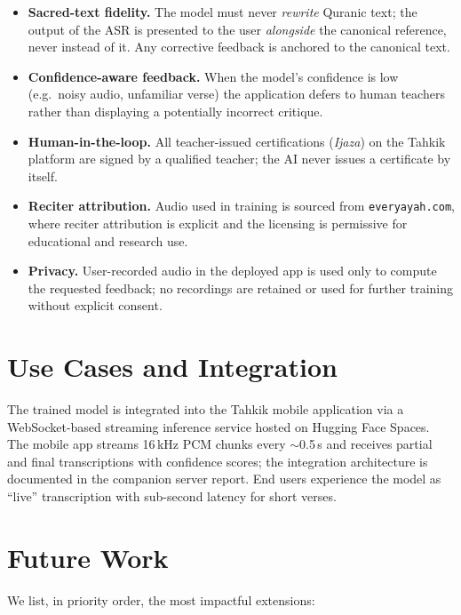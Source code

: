 \documentclass[12pt,a4paper]{report}
\begin{document}
\begin{itemize}
  \item \textbf{Sacred-text fidelity.} The model must never \emph{rewrite}
        Quranic text; the output of the ASR is presented to the user
        \emph{alongside} the canonical reference, never instead of it.
        Any corrective feedback is anchored to the canonical text.
  \item \textbf{Confidence-aware feedback.} When the model's confidence
        is low (e.g.\ noisy audio, unfamiliar verse) the application
        defers to human teachers rather than displaying a potentially
        incorrect critique.
  \item \textbf{Human-in-the-loop.} All teacher-issued certifications
        (\textit{Ijaza}) on the Tahkik platform are signed by a
        qualified teacher; the AI never issues a certificate by itself.
  \item \textbf{Reciter attribution.} Audio used in training is sourced
        from \texttt{everyayah.com}, where reciter attribution is
        explicit and the licensing is permissive for educational and
        research use.
  \item \textbf{Privacy.} User-recorded audio in the deployed app is
        used only to compute the requested feedback; no recordings are
        retained or used for further training without explicit consent.
\end{itemize}

\section{Use Cases and Integration}

The trained model is integrated into the Tahkik mobile application via a
WebSocket-based streaming inference service hosted on Hugging Face
Spaces. The mobile app streams 16\,kHz PCM chunks every $\sim$0.5\,s
and receives partial and final transcriptions with confidence scores;
the integration architecture is documented in the companion server
report. End users experience the model as ``live'' transcription with
sub-second latency for short verses.

\section{Future Work}

We list, in priority order, the most impactful extensions:
\end{document}
